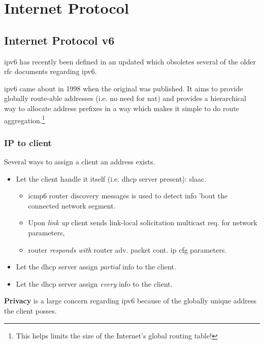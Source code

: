 \chapter[IP]{Internet Protocol}

\section[IPv6]{Internet Protocol v6}

\gls{ipv6} has recently been defined in an updated  which obsoletes several of the older \gls{rfc} documents regarding \gls{ipv6}.

\gls{ipv6} came about in 1998 when the original  was published. It aims to provide globally route-able addresses (i.e. no need for \gls{nat}) and provides a hierarchical way to allocate address prefixes in a way which makes it simple to do route aggregation.\footnote{This helps limits the size of the Internet's global routing table!}\cite{wiki:IPv6}


\subsection{IP to client}

Several ways to assign a client an address exists.
\begin{itemize}
    \item Let the client handle it itself (i.e. \gls{dhcp} server present): \gls{slaac}.
    \begin{itemize}
        \item \gls{icmp6} router discovery messages is used to detect info 'bout the connected network segment.
        \item Upon \textit{link up} client sends link-local solicitation multicast req. for network parameters,
        \item router \textit{responds with}  router adv. packet cont. \gls{ip} cfg parameters.
    \end{itemize}
    \item Let the \gls{dhcp} server assign \textit{partial} info to the client.
    \item Let the \gls{dhcp} server assign \textit{every} info to the client.
\end{itemize}

\textbf{Privacy} is a large concern regarding \gls{ipv6} because of the globally unique address the client posses.

